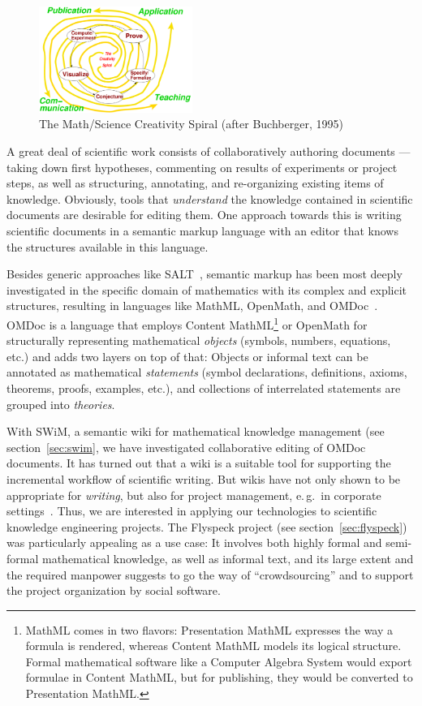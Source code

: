 \documentclass{llncs}
\begin{document}
\begin{figure}
  \centering
  \vspace{-.5cm}
  \includegraphics[width=5cm]{creativity-spiral}
  \vspace{-.5cm}
  \caption{The Math/Science Creativity Spiral (after Buchberger, 1995)}
  \label{fig:creativity-spiral}
\end{figure}
A great deal of scientific work consists of collaboratively authoring documents --- taking
down first hypotheses, commenting on results of experiments or project steps, as well as
structuring, annotating, and re-organizing existing items of knowledge.  Obviously, tools
that \emph{understand} the knowledge contained in scientific documents are desirable for
editing them.  One approach towards this is writing scientific documents in a semantic
markup language with an editor that knows the structures available in this language.

Besides generic approaches like SALT~\cite{Groza:SALT07}, semantic markup has been most
deeply investigated in the specific domain of mathematics with its complex and explicit
structures, resulting in languages like MathML, OpenMath, and
OMDoc~\cite{Kohlhase:omdoc1.2}.  OMDoc is a language that employs Content
MathML\footnote{MathML comes in two flavors: Presentation MathML expresses the way a
  formula is rendered, whereas Content MathML models its logical structure.  Formal
  mathematical software like a Computer Algebra System would export formulae in Content
  MathML, but for publishing, they would be converted to Presentation MathML.} or OpenMath
for structurally representing mathematical \emph{objects} (symbols, numbers, equations,
etc.) and adds two layers on top of that: Objects or informal text can be annotated as
mathematical \emph{statements} (symbol declarations, definitions, axioms, theorems,
proofs, examples, etc.), and collections of interrelated statements are grouped into
\emph{theories}.

With SWiM, a semantic wiki for mathematical knowledge management (see
section~\ref{sec:swim}, we have investigated collaborative editing of OMDoc documents.  It
has turned out that a wiki is a suitable tool for supporting the incremental workflow of
scientific writing.  But wikis have not only shown to be appropriate for \emph{writing},
but also for project management, e.\,g.\ in corporate settings~\cite{leuf01:wikiway}.
Thus, we are interested in applying our technologies to scientific knowledge engineering
projects.  The Flyspeck project (see section~\ref{sec:flyspeck}) was particularly
appealing as a use case: It involves both highly formal and semi-formal mathematical
knowledge, as well as informal text, and its large extent and the required manpower
suggests to go the way of ``crowdsourcing'' and to support the project organization by
social software.
\end{document}
